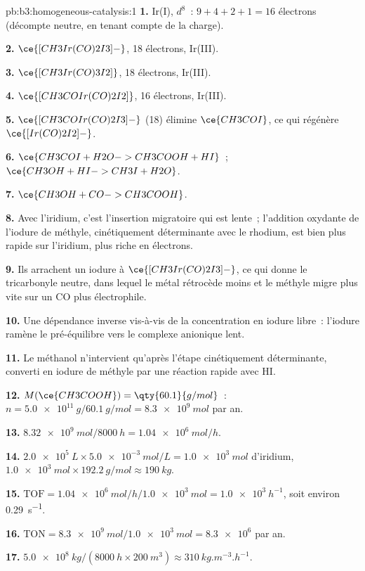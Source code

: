 \begin{solution}{pb:b3:homogeneous-catalysis:1}
\textbf{1.} Ir(I), $d^8$~: $9 + 4 + 2 + 1 = 16$ électrons (décompte neutre, en tenant compte de la charge).

\textbf{2.} $\ce{[CH3Ir(CO)2I3]-}$, 18 électrons, Ir(III).

\textbf{3.} $\ce{[CH3Ir(CO)3I2]}$, 18 électrons, Ir(III).

\textbf{4.} $\ce{[CH3COIr(CO)2I2]}$, 16 électrons, Ir(III).

\textbf{5.} $\ce{[CH3COIr(CO)2I3]-}$ (18) élimine $\ce{CH3COI}$, ce qui régénère $\ce{[Ir(CO)2I2]-}$.

\textbf{6.} $\ce{CH3COI + H2O -> CH3COOH + HI}$~; $\ce{CH3OH + HI -> CH3I + H2O}$.

\textbf{7.} $\ce{CH3OH + CO -> CH3COOH}$.

\textbf{8.} Avec l'iridium, c'est l'insertion migratoire qui est lente~;
l'addition oxydante de l'iodure de méthyle, cinétiquement déterminante avec
le rhodium, est bien plus rapide sur l'iridium, plus riche en électrons.

\textbf{9.} Ils arrachent un iodure à $\ce{[CH3Ir(CO)2I3]-}$, ce qui donne le tricarbonyle neutre, dans lequel
le métal rétrocède moins et le méthyle migre plus vite sur un CO plus
électrophile.

\textbf{10.} Une dépendance inverse vis-à-vis de la concentration en iodure
libre~: l'iodure ramène le pré-équilibre vers le complexe anionique lent.

\textbf{11.} Le méthanol n'intervient qu'après l'étape cinétiquement
déterminante, converti en iodure de méthyle par une réaction rapide avec
HI.

\textbf{12.} $M(\ce{CH3COOH}) = \qty{60.1}{g/mol}$~: $n = \qty{5.0e11}{g}/\qty{60.1}{g/mol} = \qty{8.3e9}{mol}$ par an.

\textbf{13.} $\qty{8.32e9}{mol}/\qty{8000}{h} = \qty{1.04e6}{mol/h}$.

\textbf{14.} $\qty{2.0e5}{L} \times \qty{5.0e-3}{mol/L} = \qty{1.0e3}{mol}$ d'iridium, $\qty{1.0e3}{mol} \times \qty{192.2}{g/mol} \approx \qty{190}{kg}$.

\textbf{15.} $\mathrm{TOF} = \qty{1.04e6}{mol/h}/\qty{1.0e3}{mol} = \qty{1.0e3}{h^{-1}}$, soit environ \qty{0.29}{s^{-1}}.

\textbf{16.} $\mathrm{TON} = \qty{8.3e9}{mol}/\qty{1.0e3}{mol} = \num{8.3e6}$ par an.

\textbf{17.} $\qty{5.0e8}{kg}/(\qty{8000}{h} \times \qty{200}{m^3}) \approx \qty{310}{kg.m^{-3}.h^{-1}}$.


\end{solution}
